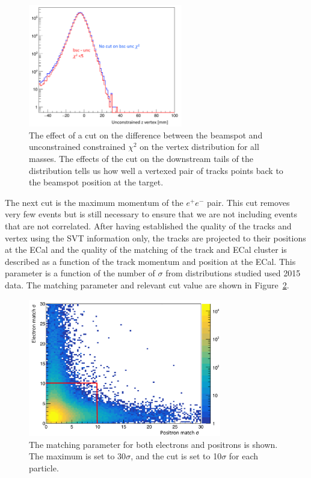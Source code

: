 \begin{figure}[htb]
  \centering
      \includegraphics[width=0.6\textwidth]{pics/searching/bmuchi2.png}
  \caption[Vertex cut on the difference between beamspot and unconstrained $\chi^2$]{The effect of a cut on the difference between the beamspot and unconstrained constrained $\chi^2$ on the vertex distribution for all masses. The effects of the cut on the downstream tails of the distribution tells us how well a vertexed pair of tracks points back to the beamspot position at the target.}
  \label{fig:bmucut}
\end{figure} 

The next cut is the maximum momentum of the $e^+e^-$ pair. This cut removes very few events but is still necessary to ensure that we are not including events that are not correlated. After having established the quality of the tracks and vertex using the SVT information only, the tracks are projected to their positions at the ECal and the quality of the matching of the track and ECal cluster is described as a function of the track momentum and position at the ECal. This parameter is a function of the number of $\sigma$ from distributions studied used 2015 data. The matching parameter and relevant cut value are shown in Figure~\ref{fig:matchcut}. 

\begin{figure}[htb]
  \centering
      \includegraphics[width=0.75\textwidth]{pics/searching/matchcut.png}
  \caption[Cut on the track-cluster matching]{The matching parameter for both electrons and positrons is shown. The maximum is set to 30$\sigma$, and the cut is set to 10$\sigma$ for each particle.}
  \label{fig:matchcut}
\end{figure} 

